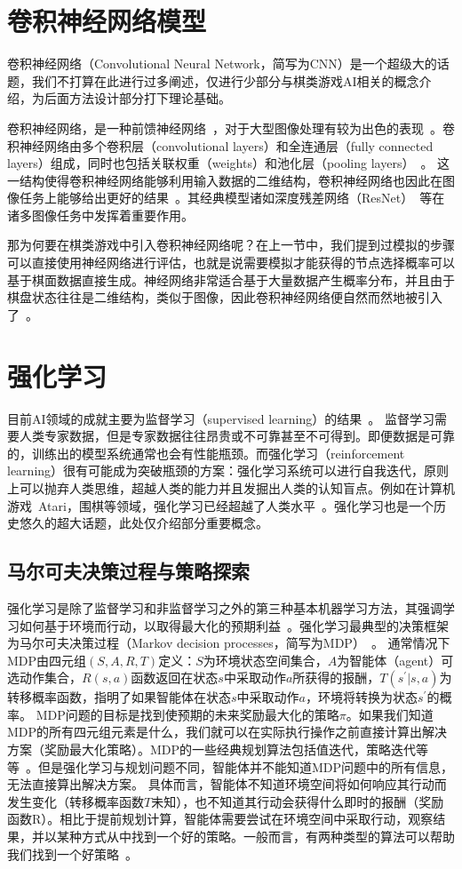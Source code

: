 \section{卷积神经网络模型}
卷积神经网络（Convolutional Neural Network，简写为CNN）是一个超级大的话题，我们不打算在此进行过多阐述，仅进行少部分与棋类游戏AI相关的概念介绍，为后面方法设计部分打下理论基础。

卷积神经网络，是一种前馈神经网络~\cite{SCHMIDHUBER201585}，对于大型图像处理有较为出色的表现~\cite{NIPS2012_4824}。卷积神经网络由多个卷积层（convolutional layers）和全连通层（fully connected layers）组成，同时也包括关联权重（weights）和池化层（pooling layers）~\cite{venkatesan2017convolutional}。
这一结构使得卷积神经网络能够利用输入数据的二维结构，卷积神经网络也因此在图像任务上能够给出更好的结果~\cite{VALUEVA2020232}。其经典模型诸如深度残差网络（ResNet）~\cite{resnet}等在诸多图像任务中发挥着重要作用。

那为何要在棋类游戏中引入卷积神经网络呢？在上一节中，我们提到过模拟的步骤可以直接使用神经网络进行评估，也就是说需要模拟才能获得的节点选择概率可以基于棋面数据直接生成。神经网络非常适合基于大量数据产生概率分布，并且由于棋盘状态往往是二维结构，类似于图像，因此卷积神经网络便自然而然地被引入了~\cite{Silver1140,Silver2017,Silver2016}。

\section{强化学习}
目前AI领域的成就主要为监督学习（supervised learning）的结果~\cite{NIPS2012_4824,resnet,hastie2009elements,lecun2015deep}。
监督学习需要人类专家数据，但是专家数据往往昂贵或不可靠甚至不可得到。即便数据是可靠的，训练出的模型系统通常也会有性能瓶颈。而强化学习（reinforcement learning）很有可能成为突破瓶颈的方案：强化学习系统可以进行自我迭代，原则上可以抛弃人类思维，超越人类的能力并且发掘出人类的认知盲点。例如在计算机游戏~Atari，围棋等领域，强化学习已经超越了人类水平~\cite{Silver2016}。强化学习也是一个历史悠久的超大话题，此处仅介绍部分重要概念。
\subsection{马尔可夫决策过程与策略探索}
强化学习是除了监督学习和非监督学习之外的第三种基本机器学习方法，其强调学习如何基于环境而行动，以取得最大化的预期利益~\cite{Sutton1998}。强化学习最典型的决策框架为马尔可夫决策过程（Markov decision processes，简写为MDP）~\cite{Bel}。
通常情况下MDP由四元组$(S,A,R,T)$定义：$S$为环境状态空间集合，$A$为智能体（agent）可选动作集合，$R(s,a)$函数返回在状态$s$中采取动作$a$所获得的报酬，$T(s^{\prime}|s,a)$为转移概率函数，指明了如果智能体在状态$s$中采取动作$a$，环境将转换为状态$s^{\prime}$的概率。
MDP问题的目标是找到使预期的未来奖励最大化的策略$\pi$。如果我们知道MDP的所有四元组元素是什么，我们就可以在实际执行操作之前直接计算出解决方案（奖励最大化策略）。MDP的一些经典规划算法包括值迭代，策略迭代等等~\cite{Sutton1998}。但是强化学习与规划问题不同，智能体并不能知道MDP问题中的所有信息，无法直接算出解决方案。
具体而言，智能体不知道环境空间将如何响应其行动而发生变化（转移概率函数$T$未知），也不知道其行动会获得什么即时的报酬（奖励函数R）。相比于提前规划计算，智能体需要尝试在环境空间中采取行动，观察结果，并以某种方式从中找到一个好的策略。一般而言，有两种类型的算法可以帮助我们找到一个好策略~\cite{rlbase}。

